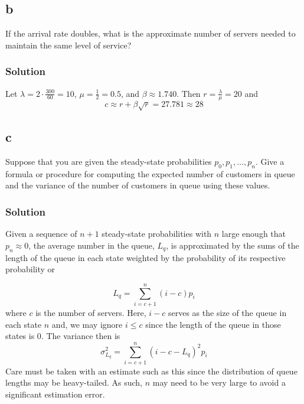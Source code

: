 \documentclass[letterpaper]{amsart}
\begin{document}
\subsection*{b}
If the arrival rate doubles, what is the approximate number of servers
needed to maintain the same level of service?

\subsubsection*{Solution}
Let $\lambda = 2\cdot\frac{300}{60}=10$, $\mu=\frac{1}{2}=0.5$, and $\beta\approx1.740$. Then
$r=\frac{\lambda}{\mu}=20$ and
\begin{equation*}
  c\approx r + \beta\sqrt{r} = 27.781 \approx 28
\end{equation*}

\subsection*{c}
Suppose that you are given the steady-state probabilities $p_0,p_1,\ldots,p_n$.
Give a formula or procedure for computing the expected number of
customers in queue and the variance of the number of customers in
queue using these values.

\subsubsection*{Solution}
Given a sequence of $n+1$ steady-state probabilities with $n$ large enough that
$p_n \approx 0$, the average number in the queue, $L_q$, is approximated by the
sums of the length of the queue in each state weighted by the probability of its
respective probability or


\begin{equation*}
  L_q = \sum_{i=c+1}^n(i-c)p_i
\end{equation*}
where $c$ is the number of servers.
Here, $i-c$ serves as the size of the queue in each state $n$ and, we may ignore
$i\leq c$ since the length of the queue in those states is 0.
The variance then is
\begin{equation*}
  \sigma_{L_q}^2 = \sum_{i=c+1}^n(i-c-L_q)^2p_i
\end{equation*}
Care must be taken with an estimate such as this since the distribution of queue
lengths may be heavy-tailed.
As such, $n$ may need to be very large to avoid a significant estimation error.
\end{document}
